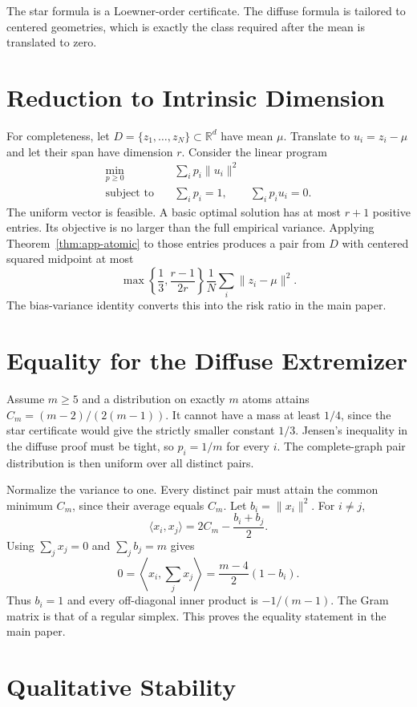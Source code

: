 \documentclass[twoside]{article}
\newcommand{\R}{\mathbb R}
\begin{document}
The star formula is a Loewner-order certificate. The diffuse formula is
tailored to centered geometries, which is exactly the class required after
the mean is translated to zero.

\section{Reduction to Intrinsic Dimension}\label{app:reduction}

For completeness, let $D=\{z_1,\ldots,z_N\}\subset\R^d$ have mean $\mu$.
Translate to $u_i=z_i-\mu$ and let their span have dimension $r$. Consider
the linear program
\begin{align*}
 \min_{p\geq0}\quad&\sum_i p_i\|u_i\|^2\\
 \text{subject to}\quad&\sum_i p_i=1,
 \qquad \sum_i p_i u_i=0.
\end{align*}
The uniform vector is feasible. A basic optimal solution has at most $r+1$
positive entries. Its objective is no larger than the full empirical
variance. Applying Theorem~\ref{thm:app-atomic} to those entries produces a
pair from $D$ with centered squared midpoint at most
\[
 \max\left\{\frac13,\frac{r-1}{2r}\right\}
 \frac1N\sum_i\|z_i-\mu\|^2.
\]
The bias-variance identity converts this into the risk ratio in the main
paper.

\section{Equality for the Diffuse Extremizer}\label{app:equality}

Assume $m\geq5$ and a distribution on exactly $m$ atoms attains
$C_m=(m-2)/(2(m-1))$. It cannot have a mass at least $1/4$, since the star
certificate would give the strictly smaller constant $1/3$. Jensen's
inequality in the diffuse proof must be tight, so $p_i=1/m$ for every $i$.
The complete-graph pair distribution is then uniform over all distinct pairs.

Normalize the variance to one. Every distinct pair must attain the common
minimum $C_m$, since their average equals $C_m$. Let
$b_i=\|x_i\|^2$. For $i\ne j$,
\[
 \langle x_i,x_j\rangle=2C_m-\frac{b_i+b_j}{2}.
\]
Using $\sum_jx_j=0$ and $\sum_jb_j=m$ gives
\[
 0=\left\langle x_i,\sum_jx_j\right\rangle
 =\frac{m-4}{2}(1-b_i).
\]
Thus $b_i=1$ and every off-diagonal inner product is $-1/(m-1)$. The Gram
matrix is that of a regular simplex. This proves the equality statement in
the main paper.

\section{Qualitative Stability}\label{app:stability}
\end{document}
